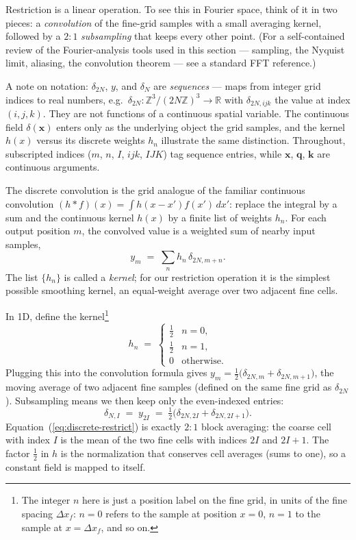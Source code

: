 \documentclass[12pt]{article}
\newcommand{\notefft}{a standard FFT reference\xspace}
\begin{document}
Restriction is a linear operation. To see this in Fourier space,
think of it in two pieces: a \emph{convolution} of the fine-grid
samples with a small averaging kernel, followed by a $2{:}1$
\emph{subsampling} that keeps every other point. (For a self-contained
review of the Fourier-analysis tools used in this section ---
sampling, the Nyquist limit, aliasing, the convolution theorem ---
see \notefft.)

A note on notation: $\delta_{2N}$, $y$, and $\delta_N$ are
\emph{sequences} --- maps from integer grid indices to real numbers,
e.g.\ $\delta_{2N}:\mathbb Z^3/(2N\mathbb Z)^3\to\mathbb R$ with
$\delta_{2N,ijk}$ the value at index $(i,j,k)$. They are not functions
of a continuous spatial variable. The continuous field
$\delta(\mathbf x)$ enters only as the underlying object the grid
samples, and the kernel $h(x)$ versus its discrete weights $h_n$
illustrate the same distinction. Throughout, subscripted indices
($m$, $n$, $I$, $ijk$, $IJK$) tag sequence entries, while $\mathbf x$,
$\mathbf q$, $\mathbf k$ are continuous arguments.

The discrete convolution is the grid analogue of the familiar
continuous convolution
$(h*f)(x)=\int h(x-x')f(x')\,dx'$: replace the integral by a sum and
the continuous kernel $h(x)$ by a finite list of weights $h_n$. For
each output position $m$, the convolved value is a weighted sum of
nearby input samples,
\begin{equation}
  y_m \;=\; \sum_n h_n\,\delta_{2N,m+n}.
\end{equation}
The list $\{h_n\}$ is called a \emph{kernel}; for our restriction
operation it is the simplest possible smoothing kernel, an equal-weight
average over two adjacent fine cells.

In 1D, define the kernel\footnote{The integer $n$ here is just a
position label on the fine grid, in units of the fine spacing $\Delta x_f$:
$n=0$ refers to the sample at position $x=0$, $n=1$ to the sample at
$x=\Delta x_f$, and so on.}
\begin{equation}
  h_n \;=\;
  \begin{cases}
    \tfrac12 & n=0,\\
    \tfrac12 & n=1,\\
    0 & \text{otherwise}.
  \end{cases}
\end{equation}
Plugging this into the convolution formula gives
$y_m = \tfrac12\bigl(\delta_{2N,m} + \delta_{2N,m+1}\bigr)$,
the moving average of two adjacent fine samples (defined on the same
fine grid as $\delta_{2N}$). Subsampling means we then keep only the
even-indexed entries:
\begin{equation}\label{eq:discrete-restrict}
  \delta_{N,I} \;=\; y_{2I}
              \;=\; \tfrac12\bigl(\delta_{2N,2I} + \delta_{2N,2I+1}\bigr).
\end{equation}
Equation~(\ref{eq:discrete-restrict}) is exactly $2{:}1$ block averaging:
the coarse cell with index $I$ is the mean of the two fine cells with
indices $2I$ and $2I+1$. The factor $\tfrac12$ in $h$ is the
normalization that conserves cell averages (sums to one), so a constant
field is mapped to itself.
\end{document}
